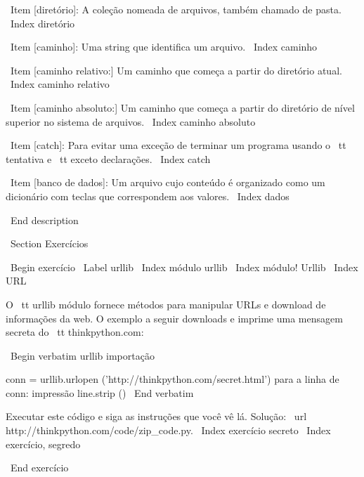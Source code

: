 \documentclass[10pt]{book}
\begin{document}
\begin {itemize}
{{{{{{{{{{{\ Item [diretório]: A coleção nomeada de arquivos, também chamado de pasta.
\ Index {diretório}

\ Item [caminho]: Uma string que identifica um arquivo.
\ Index {caminho}

\ Item [caminho relativo:] Um caminho que começa a partir do diretório atual.
\ Index {caminho relativo}

\ Item [caminho absoluto:] Um caminho que começa a partir do diretório de nível superior
no sistema de arquivos.
\ Index {caminho absoluto}

\ Item [catch]: Para evitar uma exceção de terminar
um programa usando o {\ tt tentativa}
e {\ tt exceto} declarações.
\ Index {catch}

\ Item [banco de dados]: Um arquivo cujo conteúdo é organizado como um dicionário
com teclas que correspondem aos valores.
\ Index {dados}

\ End {description}


\ Section {Exercícios}

\ Begin {} exercício
\ Label {} urllib
\ Index {módulo urllib}
\ Index {módulo! Urllib}
\ Index {URL}

O {\ tt urllib} módulo fornece métodos para manipular URLs
e download de informações da web. O exemplo a seguir
downloads e imprime uma mensagem secreta do {\ tt thinkpython.com}:

\ Begin {verbatim}
urllib importação

conn = urllib.urlopen ('http://thinkpython.com/secret.html')
para a linha de conn:
    impressão line.strip ()
\ End {verbatim}

Executar este código e siga as instruções que você vê lá.
Solução: \ url {http://thinkpython.com/code/zip_code.py}.
\ Index {exercício secreto}
\ Index {exercício, segredo}

\ End {} exercício




}}}}}}}}}}}
\end{itemize}
\end{document}
